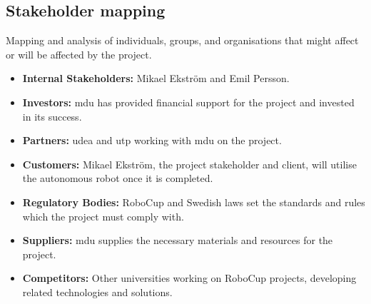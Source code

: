 
\subsection{Stakeholder mapping}

Mapping and analysis of individuals, groups, and organisations that might affect or will be affected by the project.

\begin{itemize}
    \item \textbf{Internal Stakeholders:} Mikael Ekström and Emil Persson.
    \item \textbf{Investors:} \ac{mdu} has provided financial support for the project and invested in its success. 
    \item \textbf{Partners:} \ac{udea} and \ac{utp} working with \ac{mdu} on the project.
    \item \textbf{Customers:} Mikael Ekström, the project stakeholder and client, will utilise the autonomous robot once it is completed. 
    \item \textbf{Regulatory Bodies:} RoboCup and Swedish laws set the standards and rules which the project must comply with. 
    \item \textbf{Suppliers:} \ac{mdu} supplies the necessary materials and resources for the project. 
    \item \textbf{Competitors:} Other universities working on RoboCup projects, developing related technologies and solutions. 
\end{itemize}

